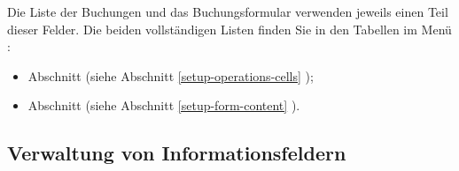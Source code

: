 Die Liste der Buchungen und das Buchungsformular verwenden jeweils einen Teil dieser Felder. Die beiden vollständigen Listen finden Sie in den Tabellen im Menü :
\begin{itemize}
	\item Abschnitt  (siehe Abschnitt \vref{setup-operations-cells} );
	\item Abschnitt  (siehe Abschnitt \vref{setup-form-content} ).
\end{itemize}


\subsection{Verwaltung von Informationsfeldern\label{transactions-list-fields-manage}}

